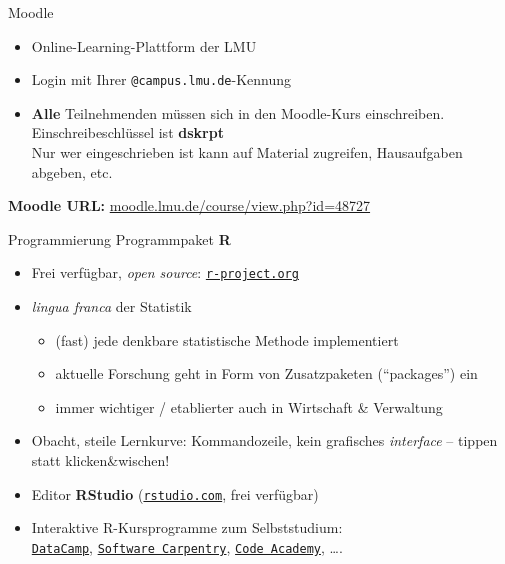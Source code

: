 \documentclass[
  10pt,
  ignorenonframetext,
]{beamer}
\providecommand{\tightlist}{%
  \setlength{\itemsep}{0pt}\setlength{\parskip}{0pt}}
\begin{document}
\begin{frame}[fragile]{Moodle}
\protect\hypertarget{moodle}{}
\begin{itemize}
\tightlist
\item
  Online-Learning-Plattform der LMU
\item
  Login mit Ihrer \texttt{@campus.lmu.de}-Kennung
\item
  \textbf{Alle} Teilnehmenden müssen sich in den Moodle-Kurs
  einschreiben.\\
  Einschreibeschlüssel ist \textbf{dskrpt}\\
  Nur wer eingeschrieben ist kann auf Material zugreifen, Hausaufgaben
  abgeben, etc.
\end{itemize}

\textbf{Moodle URL:}
\href{https://moodle.lmu.de/course/view.php?id=48727}{moodle.lmu.de/course/view.php?id=48727}
\end{frame}

\begin{frame}[fragile]{Programmierung}
\protect\hypertarget{programmierung}{}
Programmpaket \textbf{R}

\begin{itemize}
\item
  Frei verfügbar, \emph{open source}:
  \href{https://www.r-project.org/}{\texttt{r-project.org}}
\item
  \emph{lingua franca} der Statistik

  \begin{itemize}
  \tightlist
  \item
    (fast) jede denkbare statistische Methode implementiert
  \item
    aktuelle Forschung geht in Form von Zusatzpaketen (``packages'') ein
  \item
    immer wichtiger / etablierter auch in Wirtschaft \& Verwaltung
  \end{itemize}
\item
  Obacht, steile Lernkurve: Kommandozeile, kein grafisches
  \emph{interface} -- tippen statt klicken\&wischen!
\item
  Editor \textbf{RStudio}
  (\href{https://www.rstudio.com/}{\texttt{rstudio.com}}, frei
  verfügbar)
\item
  Interaktive R-Kursprogramme zum Selbststudium:\\
  \href{https://learn.datacamp.com/courses?technologies=R}{\texttt{DataCamp}},
  \href{http://swcarpentry.github.io/r-novice-inflammation/}{\texttt{Software\ Carpentry}},
  \href{https://www.codecademy.com/learn/learn-r}{\texttt{Code\ Academy}},
  \ldots.
\end{itemize}
\end{frame}
\end{document}
